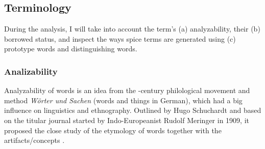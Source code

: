 \subsection{Terminology}
During the analysis, I will take into account the term's (a) analyzability, their (b) borrowed status, and inspect the ways spice terms are generated using (c) prototype words and distinguishing words.

\subsubsection{Analizability}

Analyzability of words is an idea from the -century philological movement and method \textit{Wörter und Sachen} (words and things in German), which had a big influence on linguistics and ethnography. Outlined by Hugo Schuchardt and based on the titular journal \textit{} started by Indo-Europeanist Rudolf Meringer in 1909, it proposed the close study of the etymology of words together with the artifacts/concepts \autocite{ortutay_magyar_1977}. 




